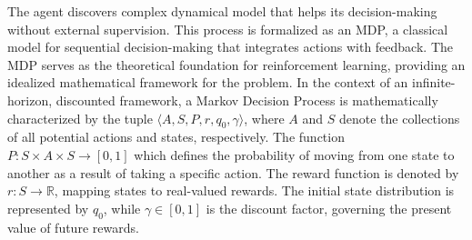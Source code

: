 \documentclass[conference]{IEEEtran}
\providecommand{\DIFadd}[1]{{\protect\color{blue}\uwave{#1}}} %
\providecommand{\DIFaddbegin}{} %
\providecommand{\DIFaddend}{} %
\newcommand{\DIFaddincludegraphics}[2][]{{\color{blue}\fbox{\DIFOincludegraphics[#1]{#2}}}} %
\DeclareRobustCommand{\DIFaddbegin}{\DIFOaddbegin \let\includegraphics\DIFaddincludegraphics} %
\DeclareRobustCommand{\DIFaddend}{\DIFOaddend \let\includegraphics\DIFOincludegraphics} %
\begin{document}
The agent discovers \DIFaddbegin \DIFadd{a }\DIFaddend complex dynamical model that helps its decision-making without external supervision. This process is formalized as an MDP, a classical model for sequential decision-making that integrates actions with feedback. The MDP serves as the theoretical foundation for reinforcement learning, providing an idealized mathematical framework for the problem.
In the context of an infinite-horizon, discounted framework, a Markov Decision Process is mathematically characterized by the tuple \( \langle A, S, P, r, q_0, \gamma \rangle \), where \( A \) and \( S \) denote the collections of all potential actions and states, respectively. The function \( P: S \times A \times S \to [0, 1] \)
which defines the probability of moving from one state to another as a result of taking a specific action. The reward function is denoted by \( r: S \to \mathbb{R} \), mapping states to real-valued rewards.
The initial state distribution is represented by \( q_0 \), while \( \gamma \in [0, 1] \) is the discount factor, governing the present value of future rewards.



\end{document}
